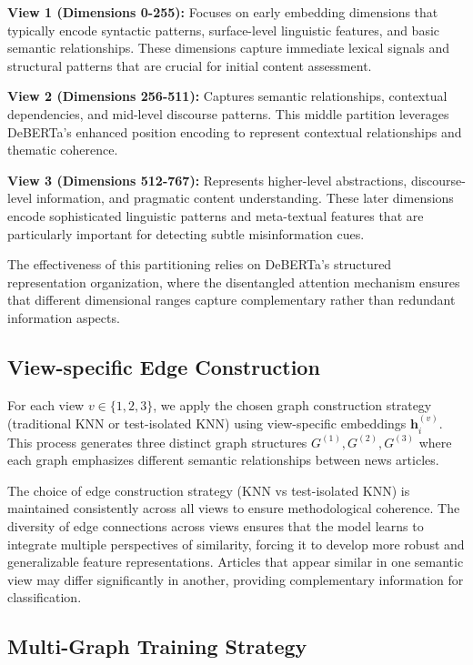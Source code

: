 \textbf{View 1 (Dimensions 0-255):} Focuses on early embedding dimensions that typically encode syntactic patterns, surface-level linguistic features, and basic semantic relationships. These dimensions capture immediate lexical signals and structural patterns that are crucial for initial content assessment.

\textbf{View 2 (Dimensions 256-511):} Captures semantic relationships, contextual dependencies, and mid-level discourse patterns. This middle partition leverages DeBERTa's enhanced position encoding to represent contextual relationships and thematic coherence.

\textbf{View 3 (Dimensions 512-767):} Represents higher-level abstractions, discourse-level information, and pragmatic content understanding. These later dimensions encode sophisticated linguistic patterns and meta-textual features that are particularly important for detecting subtle misinformation cues.

The effectiveness of this partitioning relies on DeBERTa's structured representation organization, where the disentangled attention mechanism ensures that different dimensional ranges capture complementary rather than redundant information aspects.

\subsection{View-specific Edge Construction}

For each view $v \in \{1, 2, 3\}$, we apply the chosen graph construction strategy (traditional KNN or test-isolated KNN) using view-specific embeddings $\mathbf{h}_i^{(v)}$. This process generates three distinct graph structures $G^{(1)}, G^{(2)}, G^{(3)}$ where each graph emphasizes different semantic relationships between news articles.

The choice of edge construction strategy (KNN vs test-isolated KNN) is maintained consistently across all views to ensure methodological coherence. The diversity of edge connections across views ensures that the model learns to integrate multiple perspectives of similarity, forcing it to develop more robust and generalizable feature representations. Articles that appear similar in one semantic view may differ significantly in another, providing complementary information for classification.

\subsection{Multi-Graph Training Strategy}

